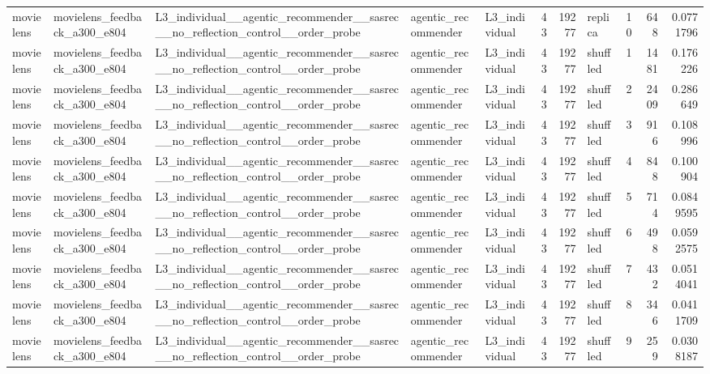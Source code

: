 \begin{table}[htbp!]
\begin{tabular}{lllllrrlrrr}
movielens & movielens\_feedback\_a300\_e804 & L3\_individual\_\_agentic\_recommender\_\_sasrec\_\_no\_reflection\_control\_\_order\_probe & agentic\_recommender & L3\_individual & 43 & 19277 & replica & 10 & 648 & 0.0771796 \\
movielens & movielens\_feedback\_a300\_e804 & L3\_individual\_\_agentic\_recommender\_\_sasrec\_\_no\_reflection\_control\_\_order\_probe & agentic\_recommender & L3\_individual & 43 & 19277 & shuffled & 1 & 1481 & 0.176226 \\
movielens & movielens\_feedback\_a300\_e804 & L3\_individual\_\_agentic\_recommender\_\_sasrec\_\_no\_reflection\_control\_\_order\_probe & agentic\_recommender & L3\_individual & 43 & 19277 & shuffled & 2 & 2409 & 0.286649 \\
movielens & movielens\_feedback\_a300\_e804 & L3\_individual\_\_agentic\_recommender\_\_sasrec\_\_no\_reflection\_control\_\_order\_probe & agentic\_recommender & L3\_individual & 43 & 19277 & shuffled & 3 & 916 & 0.108996 \\
movielens & movielens\_feedback\_a300\_e804 & L3\_individual\_\_agentic\_recommender\_\_sasrec\_\_no\_reflection\_control\_\_order\_probe & agentic\_recommender & L3\_individual & 43 & 19277 & shuffled & 4 & 848 & 0.100904 \\
movielens & movielens\_feedback\_a300\_e804 & L3\_individual\_\_agentic\_recommender\_\_sasrec\_\_no\_reflection\_control\_\_order\_probe & agentic\_recommender & L3\_individual & 43 & 19277 & shuffled & 5 & 714 & 0.0849595 \\
movielens & movielens\_feedback\_a300\_e804 & L3\_individual\_\_agentic\_recommender\_\_sasrec\_\_no\_reflection\_control\_\_order\_probe & agentic\_recommender & L3\_individual & 43 & 19277 & shuffled & 6 & 498 & 0.0592575 \\
movielens & movielens\_feedback\_a300\_e804 & L3\_individual\_\_agentic\_recommender\_\_sasrec\_\_no\_reflection\_control\_\_order\_probe & agentic\_recommender & L3\_individual & 43 & 19277 & shuffled & 7 & 432 & 0.0514041 \\
movielens & movielens\_feedback\_a300\_e804 & L3\_individual\_\_agentic\_recommender\_\_sasrec\_\_no\_reflection\_control\_\_order\_probe & agentic\_recommender & L3\_individual & 43 & 19277 & shuffled & 8 & 346 & 0.0411709 \\
movielens & movielens\_feedback\_a300\_e804 & L3\_individual\_\_agentic\_recommender\_\_sasrec\_\_no\_reflection\_control\_\_order\_probe & agentic\_recommender & L3\_individual & 43 & 19277 & shuffled & 9 & 259 & 0.0308187 \\

\end{tabular}
\end{table}
